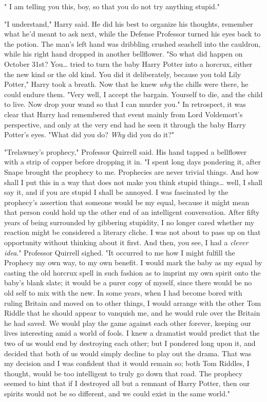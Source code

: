 " I am telling you this, boy, so that you do not
try anything stupid."

"I understand," Harry said. He did his best to organize his thoughts, remember
what he'd meant to ask next, while the Defense Professor turned his eyes back
to the potion. The man's left hand was dribbling crushed seashell into the
cauldron, while his right hand dropped in another bellflower. "So what did
happen on October 31st? You{\ldots} tried to turn the baby Harry Potter into a
horcrux, either the new kind or the old kind. You did it deliberately, because
you told Lily Potter," Harry took a breath. Now that he knew \emph{why} the
chills were there, he could endure them. "Very well, I accept the bargain.
Yourself to die, and the child to live. Now drop your wand so that I can murder
you." In retrospect, it was clear that Harry had remembered that event mainly
from Lord Voldemort's perspective, and only at the very end had he seen it
through the baby Harry Potter's eyes. "What did you do? \emph{Why} did you do
it?"

"Trelawney's prophecy," Professor Quirrell said. His hand tapped a bellflower
with a strip of copper before dropping it in. "I spent long days pondering it,
after Snape brought the prophecy to me. Prophecies are never trivial things.
And how shall I put this in a way that does not make you think stupid
things{\ldots} well, I shall say it, and if you are stupid I shall be annoyed.
I was fascinated by the prophecy's assertion that someone would be my equal,
because it might mean that person could hold up the other end of an intelligent
conversation. After fifty years of being surrounded by gibbering stupidity, I
no longer cared whether my reaction might be considered a literary cliche. I
was not about to pass up on that opportunity without thinking about it first.
And then, you see, I had a \emph{clever idea}." Professor Quirrell sighed. "It
occurred to me how I might fulfill the Prophecy my own way, to my own benefit.
I would mark the baby as my equal by casting the old horcrux spell in such
fashion as to imprint my own spirit onto the baby's blank slate; it would be a
purer copy of myself, since there would be no old self to mix with the new. In
some years, when I had become bored with ruling Britain and moved on to other
things, I would arrange with the other Tom Riddle that he should appear to
vanquish me, and he would rule over the Britain he had saved. We would play the
game against each other forever, keeping our lives interesting amid a world of
fools. I knew a dramatist would predict that the two of us would end by
destroying each other; but I pondered long upon it, and decided that both of us
would simply decline to play out the drama. That was my decision and I was
confident that it would remain so; both Tom Riddles, I thought, would be too
intelligent to truly go down that road. The prophecy seemed to hint that if I
destroyed all but a remnant of Harry Potter, then our spirits would not be so
different, and we could exist in the same world."


